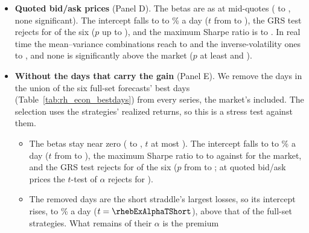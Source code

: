 \begin{itemize}
\begin{itemize}
    equally (a median of at most \rhebRtIvWsFullMax\% of capital in premium), reach \rhebRtIvFullMin{} to
    \rhebRtIvFullMax; the gain is significant for \rhebRtIvSigFullWord{} of the six ($p$ from \rhebRtIvPFullMin{} to
    \rhebRtIvPFullMax; with $\SR$, for \rhebRtIvDSixSigFullWord).
  \item With the closing-interval HAR strategy the two rules reach \rhebRtMvCiHar{} ($p = \rhebRtMvPCiHar$) and
    \rhebRtIvCiHar{} ($p = \rhebRtIvPCiHar$), with the short straddle \rhebRtMvShort{} and \rhebRtIvShort{}.
  \end{itemize}
\item \textbf{Quoted bid/ask prices} (Panel D). The betas are as at mid-quotes (\rhebBetaFullXMin{} to
  \rhebBetaFullXMax, none significant). The intercept falls to \rhebAlphaFullXMin{} to \rhebAlphaFullXMax\% a day ($t$ from
  \rhebAlphaTFullXMin{} to \rhebAlphaTFullXMax), the GRS test rejects for \rhebGrsSigFullXWord{} of the six ($p$ up to
  \rhebGrsPFullXMax), and the maximum Sharpe ratio is \rhebSRmaxFullXMin{} to \rhebSRmaxFullXMax. In real time the
  mean--variance combinations reach \rhebRtMvFullXMin{} to \rhebRtMvFullXMax{} and the inverse-volatility ones
  \rhebRtIvFullXMin{} to \rhebRtIvFullXMax, and none is significantly above the market ($p$ at least
  \rhebRtMvPFullXMin{} and \rhebRtIvPFullXMin).
\item \textbf{Without the days that carry the gain} (Panel E). We remove the \rhebNBest{} days in the union of the six
  full-set forecasts' best days (Table~\ref{tab:rh_econ_bestdays}) from every series, the market's included. The
  selection uses the strategies' realized returns, so this is a stress test against them.
  \begin{itemize}
  \item The betas stay near zero (\rhebExBetaFullMin{} to \rhebExBetaFullMax, $t$ at most \rhebExBetaTFullMax). The
    intercept falls to \rhebExAlphaFullMin{} to \rhebExAlphaFullMax\% a day ($t$ from \rhebExAlphaTFullMin{} to
    \rhebExAlphaTFullMax), the maximum Sharpe ratio to \rhebExSRmaxFullMin{} to \rhebExSRmaxFullMax{} against
    \rhebSRmEx{} for the market, and the GRS test rejects for \rhebExGrsSigFullWord{} of the six ($p$ from
    \rhebExGrsPFullMin{} to \rhebExGrsPFullMax; at quoted bid/ask prices the $t$-test of $\alpha$ rejects for
    \rhebExAlphaSigFullXWord).
  \item The removed days are the short straddle's largest losses, so its intercept rises, to \rhebExAlphaShort\% a day
    ($t = \rhebExAlphaTShort$), above that of the full-set strategies. What remains of their $\alpha$ is the premium

\end{itemize}
\end{itemize}
